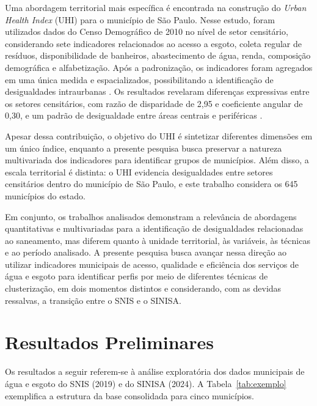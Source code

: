 \documentclass[12pt]{article}
\begin{document}
Uma abordagem territorial mais específica é encontrada na construção do \emph{Urban Health Index}
(UHI) para o município de São Paulo. Nesse estudo, foram utilizados dados do Censo Demográfico de 2010
no nível de setor censitário, considerando sete indicadores relacionados ao acesso a esgoto, coleta
regular de resíduos, disponibilidade de banheiros, abastecimento de água, renda, composição
demográfica e alfabetização. Após a padronização, os indicadores foram agregados em uma única medida
e espacializados, possibilitando a identificação de desigualdades intraurbanas \cite{lima2022}. Os
resultados revelaram diferenças expressivas entre os setores censitários, com razão de disparidade
de 2,95 e coeficiente angular de 0,30, e um padrão de desigualdade entre áreas centrais e
periféricas \cite{lima2022}.

Apesar dessa contribuição, o objetivo do UHI é sintetizar diferentes dimensões em um único índice,
enquanto a presente pesquisa busca preservar a natureza multivariada dos indicadores para identificar
grupos de municípios. Além disso, a escala territorial é distinta: o UHI evidencia desigualdades entre
setores censitários dentro do município de São Paulo, e este trabalho considera os 645 municípios do
estado.

Em conjunto, os trabalhos analisados demonstram a relevância de abordagens quantitativas e
multivariadas para a identificação de desigualdades relacionadas ao saneamento, mas diferem quanto
à unidade territorial, às variáveis, às técnicas e ao período analisado. A presente pesquisa busca
avançar nessa direção ao utilizar indicadores municipais de acesso, qualidade e eficiência dos
serviços de água e esgoto para identificar perfis por meio de diferentes técnicas de clusterização,
em dois momentos distintos e considerando, com as devidas ressalvas, a transição entre o SNIS e o
SINISA.

\section{Resultados Preliminares}

Os resultados a seguir referem-se à análise exploratória dos dados municipais de água e esgoto do
SNIS (2019) e do SINISA (2024). A Tabela~\ref{tab:exemplo} exemplifica a estrutura da base
consolidada para cinco municípios.
\end{document}
